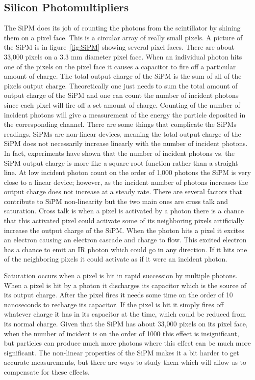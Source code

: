 \subsection{Silicon Photomultipliers}
The SiPM does its job of counting the photons from the scintillator by shining them on a pixel face. This is a circular array of really small pixels. A picture of the SiPM is in figure~\ref{fig:SiPM} showing several pixel faces. There are about 33,000 pixels on a 3.3 mm diameter pixel face. When an individual photon hits one of the pixels on the pixel face it causes a capacitor to fire off a particular amount of charge. The total output charge of the SiPM is the sum of all of the pixels output charge. Theoretically one just needs to sum the total amount of output charge of the SiPM and one can count the number of incident photons since each pixel will fire off a set amount of charge. Counting of the number of incident photons will give a measurement of the energy the particle deposited in the corresponding channel. There are some things that complicate the SiPMs readings. SiPMs are non-linear devices, meaning the total output charge of the SiPM does not necessarily increase linearly with the number of incident photons. In fact, experiments have shown that the number of incident photons vs. the SiPM output charge is more like a square root function rather than a straight line. At low incident photon count on the order of 1,000 photons the SiPM is very close to a linear device; however, as the incident number of photons increases the output charge does not increase at a steady rate. There are several factors that contribute to SiPM non-linearity but the two main ones are cross talk and saturation. Cross talk is when a pixel is activated by a photon there is a chance that this activated pixel could activate some of its neighboring pixels artificially increase the output charge of the SiPM. When the photon hits a pixel it excites an electron causing an electron cascade and charge to flow. This excited electron has a chance to emit an IR photon which could go in any direction. If it hits one of the neighboring pixels it could activate as if it were an incident photon. 

Saturation occurs when a pixel is hit in rapid succession by multiple photons. When a pixel is hit by a photon it discharges its capacitor which is the source of its output charge. After the pixel fires it needs some time on the order of 10 nanoseconds to recharge its capacitor. If the pixel is hit it simply fires off whatever charge it has in its capacitor at the time, which could be reduced from its normal charge. Given that the SiPM has about 33,000 pixels on its pixel face, when the number of incident is on the order of 1000 this effect is insignificant, but particles can produce much more photons where this effect can be much more significant. The non-linear properties of the SiPM makes it a bit harder to get accurate measurements, but there are ways to study them which will allow us to compensate for these effects.

